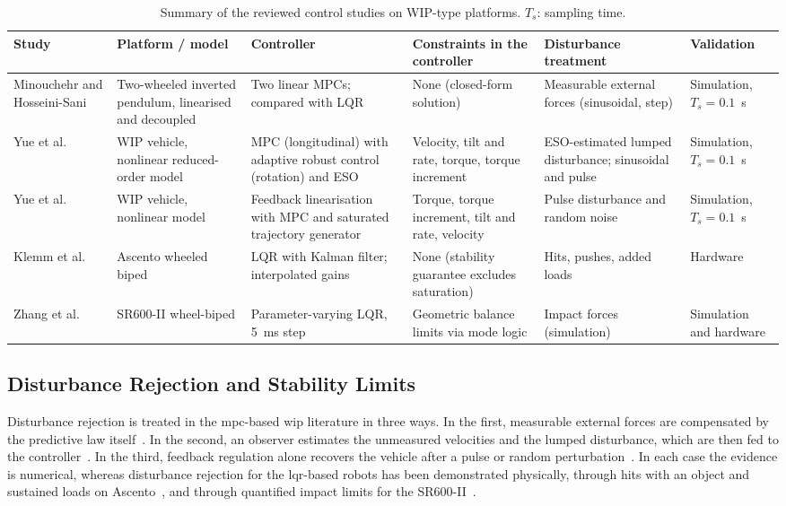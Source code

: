 \begin{table}[ht]
\centering
\footnotesize
\setlength{\tabcolsep}{4pt}
\renewcommand{\arraystretch}{1.2}
\begin{tabular}{@{}>{\raggedright\arraybackslash}p{1.9cm}>{\raggedright\arraybackslash}p{2.4cm}>{\raggedright\arraybackslash}p{2.9cm}>{\raggedright\arraybackslash}p{2.4cm}>{\raggedright\arraybackslash}p{2.3cm}>{\raggedright\arraybackslash}p{1.8cm}@{}}
\toprule
\textbf{Study} & \textbf{Platform / model} & \textbf{Controller} & \textbf{Constraints in the controller} & \textbf{Disturbance treatment} & \textbf{Validation} \\
\midrule
Minouchehr and Hosseini-Sani~\cite{minouchehr2015} & Two-wheeled inverted pendulum, linearised and decoupled & Two linear MPCs; compared with LQR & None (closed-form solution) & Measurable external forces (sinusoidal, step) & Simulation, $T_s=0.1$~s \\
Yue et al.~\cite{yue2018tsmc} & WIP vehicle, nonlinear reduced-order model & MPC (longitudinal) with adaptive robust control (rotation) and ESO & Velocity, tilt and rate, torque, torque increment & ESO-estimated lumped disturbance; sinusoidal and pulse & Simulation, $T_s=0.1$~s \\
Yue et al.~\cite{yue2018ijcas} & WIP vehicle, nonlinear model & Feedback linearisation with MPC and saturated trajectory generator & Torque, torque increment, tilt and rate, velocity & Pulse disturbance and random noise & Simulation, $T_s=0.1$~s \\
Klemm et al.~\cite{klemm2019} & Ascento wheeled biped & LQR with Kalman filter; interpolated gains & None (stability guarantee excludes saturation) & Hits, pushes, added loads & Hardware \\
Zhang et al.~\cite{zhang2022} & SR600-II wheel-biped & Parameter-varying LQR, 5~ms step & Geometric balance limits via mode logic & Impact forces (simulation) & Simulation and hardware \\
\bottomrule
\end{tabular}
\caption{Summary of the reviewed control studies on WIP-type platforms. $T_s$: sampling time.}
\label{tab:wip-summary}
\end{table}

\subsection{Disturbance Rejection and Stability Limits}\label{sec:bg-wip-dist}

Disturbance rejection is treated in the \ac{mpc}-based \ac{wip} literature in three ways. In the first, measurable external forces are compensated by the predictive law itself~\cite{minouchehr2015}. In the second, an observer estimates the unmeasured velocities and the lumped disturbance, which are then fed to the controller~\cite{yue2018tsmc}. In the third, feedback regulation alone recovers the vehicle after a pulse or random perturbation~\cite{yue2018ijcas}. In each case the evidence is numerical, whereas disturbance rejection for the \ac{lqr}-based robots has been demonstrated physically, through hits with an object and sustained loads on Ascento~\cite{klemm2019}, and through quantified impact limits for the SR600-II~\cite{zhang2022}.

